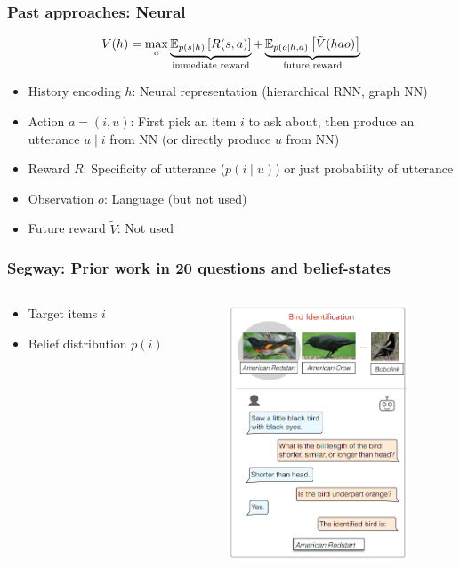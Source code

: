 \documentclass{beamer}
\begin{document}
\begin{frame}
\frametitle{Past approaches: Neural}
\begin{equation*}
V(h) = \max_a \underbrace{\mathbb{E}_{p(s \mid h)}\left[R(s, a)\right]}_{\text{immediate reward}}
+ \underbrace{\mathbb{E}_{p(o\mid h, a)}\left[\tilde{V}(hao)\right]}_{\text{future reward}}
\end{equation*}
    \begin{itemize}
    \item History encoding $h$: Neural representation (hierarchical RNN, graph NN)
    \item Action $a = (i, u)$: First pick an item $i$ to ask about, then produce an utterance
        $u \mid i$ from NN (or directly produce $u$ from NN)
    \item Reward $R$: Specificity of utterance ($p(i \mid u)$) or just probability
        of utterance
    \item Observation $o$: Language (but not used)
    \item Future reward $\tilde{V}$: Not used
    \end{itemize}
\end{frame}

\begin{frame}
\frametitle{Segway: Prior work in 20 questions and belief-states}
\begin{columns}
\begin{column}{0.5\textwidth}
\begin{itemize}
\item Target items $i$
\item Belief distribution $p(i)$
\end{itemize}
\end{column}
\begin{column}{0.5\textwidth}
\centering
\includegraphics[height=3in]{img/birds.png}
\end{column}
\end{columns}
\end{frame}
\end{document}
